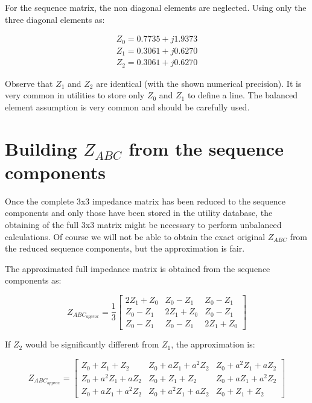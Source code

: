 \documentclass[nols,a4paper,twoside,symmetric,notoc,fleqn]{tufte-book}
\begin{document}
For the sequence matrix, the non diagonal elements are neglected. Using only the three diagonal elements as:

$$
\begin{array}{c}
Z_0 = 0.7735 + j 1.9373 \\
Z_1 = 0.3061 + j 0.6270 \\
Z_2 = 0.3061  +  j 0.6270
\end{array}
$$

Observe that $Z_1$ and $Z_2$ are identical (with the shown numerical precision). It is very common in utilities to store only $Z_0$ and $Z_1$ to define a line. The balanced element assumption is very common and should be carefully used.

\section{Building $Z_{ABC}$ from the sequence components}

Once the complete 3x3 impedance matrix has been reduced to the sequence components and only those have been stored in the utility database, the obtaining of the full 3x3 matrix might be necessary to perform unbalanced calculations. Of course we will not be able to obtain the exact original $Z_{ABC}$ from the reduced sequence components, but the approximation is fair.

The approximated full impedance matrix is obtained from the sequence components as:

\begin{equation}
Z_{ABC_{approx}} = \frac{1}{3}\left[ \begin{array}{ccc}
2Z_1 + Z_0 & Z_0 - Z_1 & Z_0 - Z_1 \\
Z_0 - Z_1 & 2Z_1 + Z_0 & Z_0 - Z_1 \\ 
Z_0 - Z_1 & Z_0 - Z_1 & 2Z_1 + Z_0
\end{array} \right]
\end{equation}

If $Z_2$ would be significantly different from $Z_1$, the approximation is:

\begin{equation}
Z_{ABC_{approx}} = \left[ \begin{array}{ccc}
Z_0+Z_1+Z_2  & Z_0 +a Z_1 +a^2 Z_2 & Z_0 +a^2 Z_1 +a Z_2 \\
Z_0 +a^2 Z_1 +a Z_2 & Z_0+Z_1+Z_2 & Z_0 +a Z_1 +a^2 Z_2 \\ 
Z_0 +a Z_1 +a^2 Z_2 & Z_0 +a^2 Z_1 +a Z_2 & Z_0+Z_1+Z_2
\end{array} \right]
\end{equation}
\end{document}
